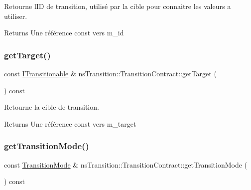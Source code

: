 Retourne l\textquotesingle{}ID de transition, utilisé par la cible pour connaitre les valeurs a utiliser. 

\begin{DoxyReturn}{Returns}
Une référence const vers m\+\_\+id 
\end{DoxyReturn}
\mbox{\label{classns_transition_1_1_transition_contract_a464b06c739e50a374c4d11509cf6e5ee}} 
\subsubsection{\texorpdfstring{get\+Target()}{getTarget()}}
{\footnotesize\ttfamily const \hyperlink{classns_transition_1_1_i_transitionable}{I\+Transitionable} \& ns\+Transition\+::\+Transition\+Contract\+::get\+Target (\begin{DoxyParamCaption}{ }\end{DoxyParamCaption}) const}



Retourne la cible de transition. 

\begin{DoxyReturn}{Returns}
Une référence const vers m\+\_\+target 
\end{DoxyReturn}
\mbox{\label{classns_transition_1_1_transition_contract_ad5d6524d7e2eeddf9f06204b8245c484}} 
\subsubsection{\texorpdfstring{get\+Transition\+Mode()}{getTransitionMode()}}
{\footnotesize\ttfamily const \hyperlink{classns_transition_1_1_transition_contract_a40118ebf3c1a0a486934ce2b9ddc3edb}{Transition\+Mode} \& ns\+Transition\+::\+Transition\+Contract\+::get\+Transition\+Mode (\begin{DoxyParamCaption}{ }\end{DoxyParamCaption}) const}



